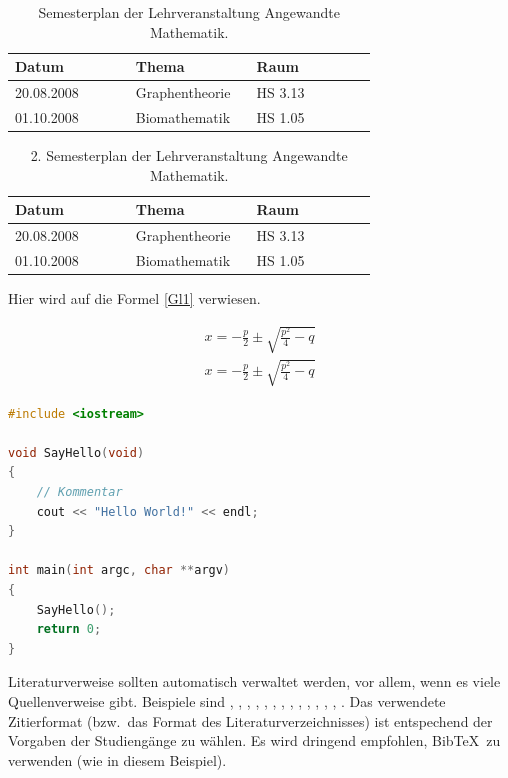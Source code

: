 \documentclass[MMR,Master,ngerman]{twbook}%
\begin{document}
\begin{table}[!htbp]
\centering
\caption{Semesterplan der Lehrveranstaltung \glqq Angewandte Mathematik\grqq.}\label{tab1}
\begin{tabular}{| p{0.3\linewidth} | p{0.3\linewidth} | p{0.3\linewidth} |}\hline
Datum & Thema & Raum\\\hline
20.08.2008 & Graphentheorie & HS 3.13\\
01.10.2008 & Biomathematik & HS 1.05\\\hline
\end{tabular}
\end{table}
\begin{table}[!htbp]
\centering
\caption{2. Semesterplan der Lehrveranstaltung \glqq Angewandte Mathematik\grqq.}\label{tab2}
\begin{tabular}{| p{0.3\linewidth} | p{0.3\linewidth} | p{0.3\linewidth} |}\hline
Datum & Thema & Raum\\\hline
20.08.2008 & Graphentheorie & HS 3.13\\
01.10.2008 & Biomathematik & HS 1.05\\\hline
\end{tabular}
\end{table}

Hier wird auf die Formel \ref{Gl1} verwiesen.

\begin{align}
x = -\frac{p}{2}\pm\sqrt{\frac{p^2}{4}-q}\label{Gl1}
\end{align}
\begin{align}
x = -\frac{p}{2}\pm\sqrt{\frac{p^2}{4}-q}\label{Gl2}
\end{align}

\begin{lstlisting}[language=C++,name={1. Beispiel},label={sc:bsp:1}]
#include <iostream>

void SayHello(void)
{
    // Kommentar
    cout << "Hello World!" << endl;
}

int main(int argc, char **argv)
{
    SayHello();
    return 0;
}
\end{lstlisting}

Literaturverweise sollten automatisch verwaltet werden, vor allem, wenn es viele Quellenverweise gibt. Beispiele sind  \cite{Ko05a}, \cite{Ko05b}, \cite{MiGo05}, \cite{TeGo14}, \cite{HuHa07}, \cite{HuZi10}, \cite{ZiKu07}, \cite{He07}, \cite{SIE11}, \cite{SIE14}, \cite{ISO98}, \cite{ATM11}, \cite{Hu11}, \cite{Po10}. Das verwendete Zitierformat (bzw.~das Format des Literaturverzeichnisses) ist entspechend der Vorgaben der Studiengänge zu wählen.
Es wird dringend empfohlen, BibTeX~zu verwenden (wie in diesem Beispiel).
\end{document}
